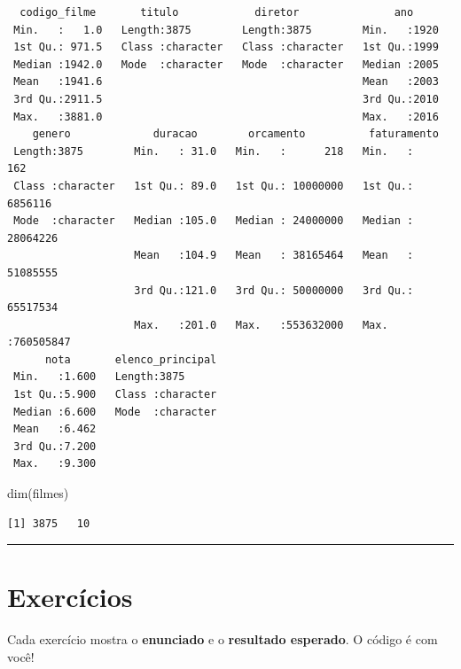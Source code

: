 \documentclass[
  letterpaper,
]{scrbook}
\newenvironment{Shaded}{\begin{snugshade}}{\end{snugshade}}
\newcommand{\FunctionTok}[1]{\textcolor[rgb]{0.28,0.35,0.67}{#1}}
\newcommand{\NormalTok}[1]{\textcolor[rgb]{0.00,0.23,0.31}{#1}}
\begin{document}
\begin{verbatim}
  codigo_filme       titulo            diretor               ano      
 Min.   :   1.0   Length:3875        Length:3875        Min.   :1920  
 1st Qu.: 971.5   Class :character   Class :character   1st Qu.:1999  
 Median :1942.0   Mode  :character   Mode  :character   Median :2005  
 Mean   :1941.6                                         Mean   :2003  
 3rd Qu.:2911.5                                         3rd Qu.:2010  
 Max.   :3881.0                                         Max.   :2016  
    genero             duracao        orcamento          faturamento       
 Length:3875        Min.   : 31.0   Min.   :      218   Min.   :      162  
 Class :character   1st Qu.: 89.0   1st Qu.: 10000000   1st Qu.:  6856116  
 Mode  :character   Median :105.0   Median : 24000000   Median : 28064226  
                    Mean   :104.9   Mean   : 38165464   Mean   : 51085555  
                    3rd Qu.:121.0   3rd Qu.: 50000000   3rd Qu.: 65517534  
                    Max.   :201.0   Max.   :553632000   Max.   :760505847  
      nota       elenco_principal  
 Min.   :1.600   Length:3875       
 1st Qu.:5.900   Class :character  
 Median :6.600   Mode  :character  
 Mean   :6.462                     
 3rd Qu.:7.200                     
 Max.   :9.300                     
\end{verbatim}

\begin{Shaded}
\begin{Highlighting}[]
\FunctionTok{dim}\NormalTok{(filmes)}
\end{Highlighting}
\end{Shaded}

\begin{verbatim}
[1] 3875   10
\end{verbatim}

\begin{center}\rule{0.5\linewidth}{0.5pt}\end{center}

\section{Exercícios}\label{exercuxedcios-3}

\begin{tcolorbox}[enhanced jigsaw, arc=.35mm, bottomrule=.15mm, bottomtitle=1mm, breakable, colback=white, colbacktitle=quarto-callout-note-color!10!white, colframe=quarto-callout-note-color-frame, coltitle=black, left=2mm, leftrule=.75mm, opacityback=0, opacitybacktitle=0.6, rightrule=.15mm, title=\textcolor{quarto-callout-note-color}{\faInfo}\hspace{0.5em}{Como fazer os exercícios}, titlerule=0mm, toprule=.15mm, toptitle=1mm]

Cada exercício mostra o \textbf{enunciado} e o \textbf{resultado
esperado}. O código é com você!

\end{tcolorbox}
\end{document}
